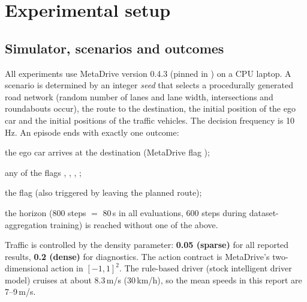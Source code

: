 \section{Experimental setup}\label{sec:setup}

\subsection{Simulator, scenarios and outcomes}
All experiments use MetaDrive version 0.4.3 (pinned in ) on a CPU laptop. A scenario is determined by an integer \emph{seed} that selects a procedurally generated road network (random number of lanes and
lane width, intersections and roundabouts occur), the route to the destination, the initial position of the ego car and the initial positions of the traffic vehicles. The decision frequency is 10\,Hz. An episode ends with exactly one outcome:
\begin{description}[leftmargin=3.2cm,style=nextline]
\item[success] the ego car arrives at the destination (MetaDrive flag );
\item[collision] any of the flags , , , ;
\item[left the road] the flag  (also triggered by leaving the planned route);
\item[timeout] the horizon (800 steps $=$ 80\,s in all evaluations, 600 steps during dataset-aggregation training) is reached without one of the above.
\end{description}
Traffic is controlled by the density parameter: \textbf{0.05 (sparse)} for all reported results, \textbf{0.2 (dense)} for diagnostics. The action contract is MetaDrive's two-dimensional action
 in $[-1,1]^2$. The rule-based driver (stock intelligent driver model) cruises at about 8.3\,m/s (30\,km/h), so the mean speeds in this report are 7--9\,m/s.

